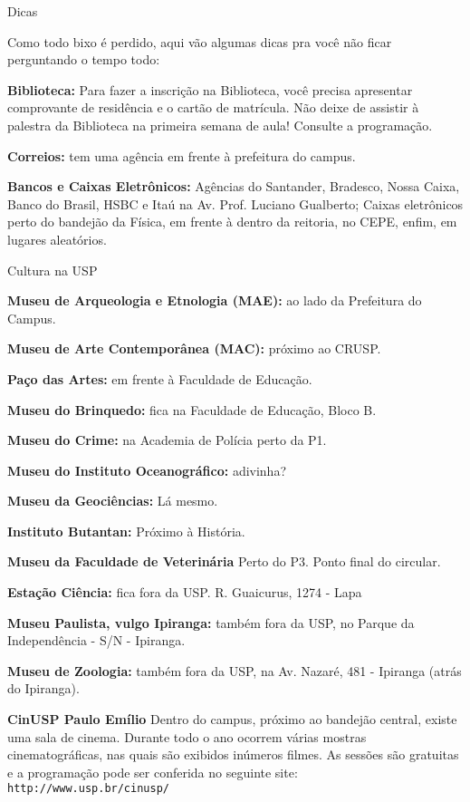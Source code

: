 \begin{secao}{Dicas}

Como todo bixo é perdido, aqui vão algumas dicas pra você não ficar perguntando o tempo todo:

{\bf Biblioteca:} Para fazer a inscrição na Biblioteca, você precisa
apresentar comprovante de residência e o cartão de matrícula. Não
deixe de assistir à palestra da Biblioteca na primeira semana de aula! Consulte a programação.

{\bf Correios:} tem uma agência em frente à prefeitura do campus.

{\bf Bancos e Caixas Eletrônicos:} Agências do Santander, Bradesco,
Nossa Caixa, Banco do Brasil, HSBC e Itaú na Av. Prof. Luciano
Gualberto; Caixas eletrônicos perto do bandejão da Física, em frente à dentro da reitoria, no CEPE, enfim, em lugares aleatórios.

\begin{subsecao}{Cultura na USP}

{\bf Museu de Arqueologia e Etnologia (MAE):} ao lado da Prefeitura do Campus.

{\bf Museu de Arte Contemporânea (MAC):} próximo ao CRUSP.

{\bf Paço das Artes:} em frente à Faculdade de Educação.

{\bf Museu do Brinquedo:} fica na Faculdade de Educação, Bloco B.

{\bf Museu do Crime:} na Academia de Polícia perto da P1.

{\bf Museu do Instituto Oceanográfico:} adivinha?

{\bf Museu da Geociências:} Lá mesmo.

{\bf Instituto Butantan:} Próximo à História.

{\bf Museu da Faculdade de Veterinária} Perto do P3. Ponto final do circular.

{\bf Estação Ciência:} fica fora da USP. R. Guaicurus, 1274 - Lapa

{\bf Museu Paulista, vulgo Ipiranga: }também fora da USP, no Parque da
Independência - S/N  - Ipiranga.

{\bf Museu de Zoologia: }também fora da USP, na Av. Nazaré, 481  -
Ipiranga (atrás do Ipiranga).

{\bf CinUSP Paulo Emílio} Dentro do campus, próximo ao bandejão central, existe uma sala de cinema. Durante todo o ano ocorrem várias mostras cinematográficas, nas quais são exibidos inúmeros filmes. As sessões são gratuitas e a programação pode ser conferida no seguinte site: {\tt http://www.usp.br/cinusp/}



\end{subsecao}
\end{secao}
